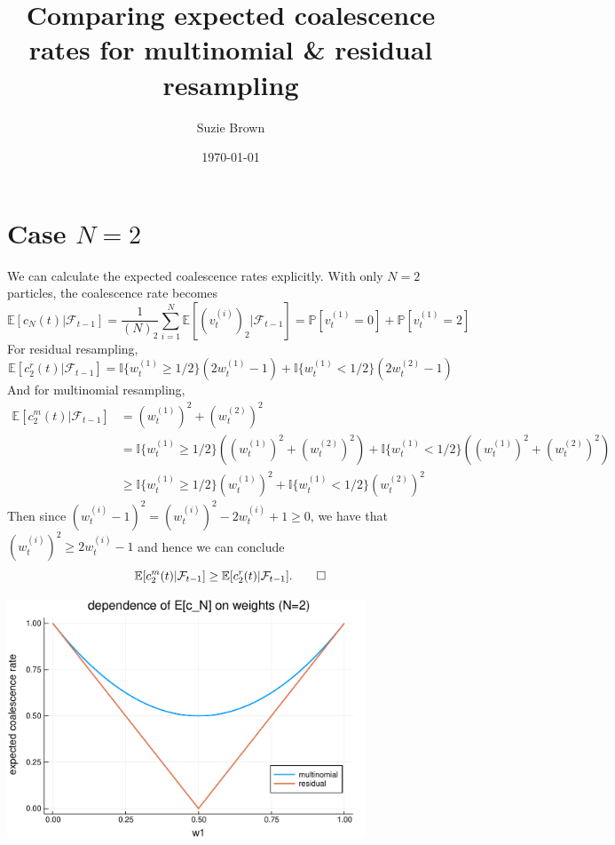 \documentclass[fleqn]{article}
\title{Comparing expected coalescence rates for multinomial \& residual resampling}
\author{Suzie Brown}
\date{\today}
\theoremstyle{definition}
\newcommand{\PR}{\mathbb{P}}
\newcommand{\E}{\mathbb{E}}
\newcommand{\I}[1]{\mathbb{I}\{#1\}}
\newcommand{\F}{\mathcal{F}_{t-1}}
\newcommand{\vt}[2][t]{v_{#1}^{(#2)}}
\newcommand{\wt}[2][t]{w_{#1}^{(#2)}}
\begin{document}
\maketitle
\thispagestyle{fancy}

\section*{Case $N=2$}
We can calculate the expected coalescence rates explicitly. With only $N=2$ particles, the coalescence rate becomes
\begin{equation*}
\E[c_N(t) |\F] = \frac{1}{(N)_2} \sum_{i=1}^{N} \E\left[ (\vt{i})_2 |\F \right] 
= \PR[\vt{1} = 0] + \PR[\vt{1} = 2]
\end{equation*}
For residual resampling,
\begin{equation*}
\E[c_2^r(t) |\F] = \I{\wt{1} \geq 1/2} (2\wt{1} -1) + \I{\wt{1} < 1/2} (2\wt{2} -1)
\end{equation*}
And for multinomial resampling,
\begin{align*}
\E[c_2^m(t) |\F] &= (\wt{1})^2 + (\wt{2})^2 \\
&= \I{\wt{1} \geq 1/2} ((\wt{1})^2 + (\wt{2})^2) + \I{\wt{1} < 1/2} ((\wt{1})^2 + (\wt{2})^2) \\
&\geq  \I{\wt{1} \geq 1/2} (\wt{1})^2 + \I{\wt{1} < 1/2} (\wt{2})^2
\end{align*}
Then since $(\wt{i} -1)^2 = (\wt{i})^2 -2\wt{i} +1 \geq 0$, we have that $(\wt{i})^2 \geq 2\wt{i} -1$ and hence we can conclude
\begin{equation*}
\E[c_2^m(t) |\F] \geq \E[c_2^r(t) |\F]. \qed
\end{equation*}

\begin{center}
\includegraphics[width=0.8\textwidth]{EcN_mn_res_N2.pdf}
\end{center}
\end{document}
